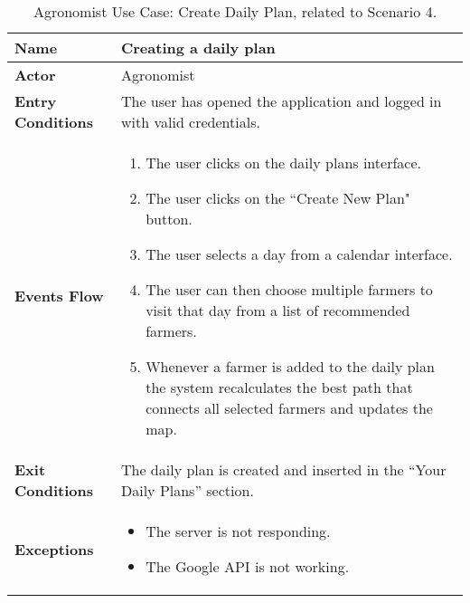 
\begin{table}[hbt!]
\centering
\small
\caption{\label{tab:agrNewPlan}Agronomist Use Case: Create Daily Plan, related to Scenario 4.}
\renewcommand{\arraystretch}{1.25}
\begin{tabular}{|l|>{\raggedright\arraybackslash}m{12cm}|}
    \hline
    \textbf{Name} & Creating a daily plan\\
    \hline
   	\textbf{Actor} & Agronomist\\
    \hline
    \textbf{Entry Conditions} & The user has opened the application and logged in with valid credentials.\\    
    \hline
    \textbf{Events Flow} & \begin{enumerate}
            \item The user clicks on the daily plans interface.
            \item The user clicks on the “Create New Plan" button.
            \item The user selects a day from a calendar interface.
            \item The user can then choose multiple farmers to visit that day from a list of recommended farmers.
            \item Whenever a farmer is added to the daily plan the system recalculates the best path that connects all selected farmers and updates the map.
       \end{enumerate} \\
    \hline
    \textbf{Exit Conditions} & The daily plan is created and inserted in the “Your Daily Plans” section.\\
    \hline
    \textbf{Exceptions} &
      \begin{itemize}
          \item The server is not responding.%
          \item The Google API is not working.%
        \end{itemize}
 \\
    \hline
\end{tabular}
\end{table}